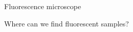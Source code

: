 \documentclass[presentation]{beamer}
\begin{document}
\begin{frame}{Fluorescence microscope}
  \centering
\end{frame}  

\begin{frame}{Where can we find fluorescent samples?} 
  \begin{columns}
    \begin{column}{.33\textwidth}
      \centering
      \\ \vspace{0.2em}
      \\

\end{column}
\end{columns}
\end{frame}
\end{document}
